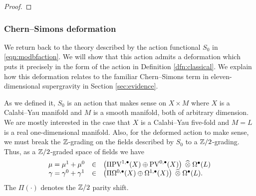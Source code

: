 \documentclass[11pt]{amsart}
\def\pv{{\rm PV}}
\begin{document}
\begin{proof}
%
%
%
%
%
%
\end{proof}


\subsubsection{Chern--Simons deformation}
We return back to the theory described by the action functional $S_0$ in \eqref{eqn:modbfaction}. 
We will show that this action admits a deformation which puts it precisely in the form of the action in Definition \ref{dfn:classical}.
We explain how this deformation relates to the familiar Chern--Simons term in eleven-dimensional supergravity in Section \ref{sec:evidence}.

As we defined it, $S_0$ is an action that makes sense on $X \times M$ where $X$ is a Calabi--Yau manifold and $M$ is a smooth manifold, both of arbitrary dimension. 
We are mostly interested in the case that $X$ is a Calabi--Yau five-fold and $M=L$ is a real one-dimensional manifold.
Also, for the deformed action to make sense, we must break the $\mathbb Z$-grading on the fields described by $S_0$ to a $\mathbb Z/2$-grading. 
Thus, as a $\mathbb Z/2$-graded space of fields we have 
\[
  \begin{array}{ccl}
    \mu = \mu^1+\mu^0 & \in & \left(\Pi \pv^{1,\bu}(X) \oplus \pv^{0,\bu}(X) \right) \; \Hat{\otimes} \; \Omega^{\bu}(L) \\
    \gamma = \gamma^0+ \gamma^1 & \in & \left(\Pi \Omega^{0,\bu}(X) \oplus \Omega^{1,\bu}(X) \right) \; \Hat{\otimes}\; \Omega^{\bu}(L) .
  \end{array}
\]
The $\Pi(\cdot)$ denotes the $\mathbb Z/2$ parity shift. 
\end{document}
